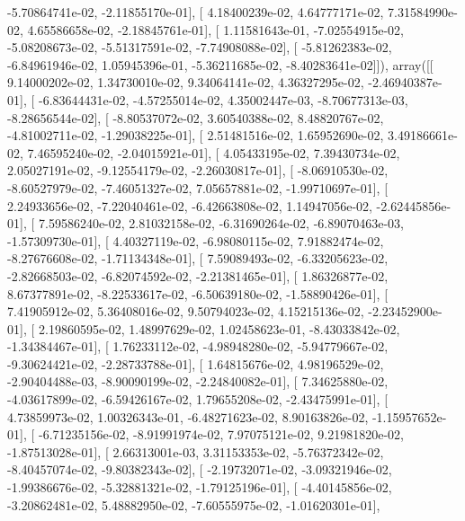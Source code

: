\documentclass{article}
\begin{document}
         -5.70864741e-02,  -2.11855170e-01],
       [  4.18400239e-02,   4.64777171e-02,   7.31584990e-02,
          4.65586658e-02,  -2.18845761e-01],
       [  1.11581643e-01,  -7.02554915e-02,  -5.08208673e-02,
         -5.51317591e-02,  -7.74908088e-02],
       [ -5.81262383e-02,  -6.84961946e-02,   1.05945396e-01,
         -5.36211685e-02,  -8.40283641e-02]]), array([[  9.14000202e-02,   1.34730010e-02,   9.34064141e-02,
          4.36327295e-02,  -2.46940387e-01],
       [ -6.83644431e-02,  -4.57255014e-02,   4.35002447e-03,
         -8.70677313e-03,  -8.28656544e-02],
       [ -8.80537072e-02,   3.60540388e-02,   8.48820767e-02,
         -4.81002711e-02,  -1.29038225e-01],
       [  2.51481516e-02,   1.65952690e-02,   3.49186661e-02,
          7.46595240e-02,  -2.04015921e-01],
       [  4.05433195e-02,   7.39430734e-02,   2.05027191e-02,
         -9.12554179e-02,  -2.26030817e-01],
       [ -8.06910530e-02,  -8.60527979e-02,  -7.46051327e-02,
          7.05657881e-02,  -1.99710697e-01],
       [  2.24933656e-02,  -7.22040461e-02,  -6.42663808e-02,
          1.14947056e-02,  -2.62445856e-01],
       [  7.59586240e-02,   2.81032158e-02,  -6.31690264e-02,
         -6.89070463e-03,  -1.57309730e-01],
       [  4.40327119e-02,  -6.98080115e-02,   7.91882474e-02,
         -8.27676608e-02,  -1.71134348e-01],
       [  7.59089493e-02,  -6.33205623e-02,  -2.82668503e-02,
         -6.82074592e-02,  -2.21381465e-01],
       [  1.86326877e-02,   8.67377891e-02,  -8.22533617e-02,
         -6.50639180e-02,  -1.58890426e-01],
       [  7.41905912e-02,   5.36408016e-02,   9.50794023e-02,
          4.15215136e-02,  -2.23452900e-01],
       [  2.19860595e-02,   1.48997629e-02,   1.02458623e-01,
         -8.43033842e-02,  -1.34384467e-01],
       [  1.76233112e-02,  -4.98948280e-02,  -5.94779667e-02,
         -9.30624421e-02,  -2.28733788e-01],
       [  1.64815676e-02,   4.98196529e-02,  -2.90404488e-03,
         -8.90090199e-02,  -2.24840082e-01],
       [  7.34625880e-02,  -4.03617899e-02,  -6.59426167e-02,
          1.79655208e-02,  -2.43475991e-01],
       [  4.73859973e-02,   1.00326343e-01,  -6.48271623e-02,
          8.90163826e-02,  -1.15957652e-01],
       [ -6.71235156e-02,  -8.91991974e-02,   7.97075121e-02,
          9.21981820e-02,  -1.87513028e-01],
       [  2.66313001e-03,   3.31153353e-02,  -5.76372342e-02,
         -8.40457074e-02,  -9.80382343e-02],
       [ -2.19732071e-02,  -3.09321946e-02,  -1.99386676e-02,
         -5.32881321e-02,  -1.79125196e-01],
       [ -4.40145856e-02,  -3.20862481e-02,   5.48882950e-02,
         -7.60555975e-02,  -1.01620301e-01],
\end{document}
